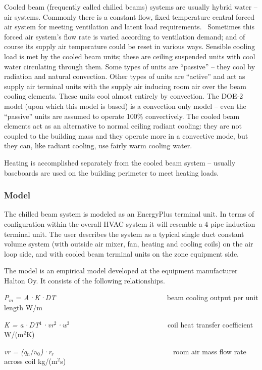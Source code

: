Cooled beam (frequently called chilled beams) systems are usually hybrid water -- air systems. Commonly there is a constant flow, fixed temperature central forced air system for meeting ventilation and latent load requirements.~ Sometimes this forced air system's flow rate is varied according to ventilation demand; and of course its supply air temperature could be reset in various ways. Sensible cooling load is met by the cooled beam units; these are ceiling suspended units with cool water circulating through them. Some types of units are ``passive'' -- they cool by radiation and natural convection. Other types of units are ``active'' and act as supply air terminal units with the supply air inducing room air over the beam cooling elements. These units cool almost entirely by convection. The DOE-2 model (upon which this model is based) is a convection only model -- even the ``passive'' units are assumed to operate 100\% convectively. The cooled beam elements act as an alternative to normal ceiling radiant cooling: they are not coupled to the building mass and they operate more in a convective mode, but they can, like radiant cooling, use fairly warm cooling water.

Heating is accomplished separately from the cooled beam system -- usually baseboards are used on the building perimeter to meet heating loads.

\subsubsection{Model}\label{model-3}

The chilled beam system is modeled as an EnergyPlus terminal unit. In terms of configuration within the overall HVAC system it will resemble a 4 pipe induction terminal unit. The user describes the system as a typical single duct constant volume system (with outside air mixer, fan, heating and cooling coils) on the air loop side, and with cooled beam terminal units on the zone equipment side.

The model is an empirical model developed at the equipment manufacturer Halton Oy. It consists of the following relationships.

\emph{P\(_{m}\)} = \emph{A·K·DT~~~~~~~} ~~~~~~~~~~~~~~~~~~~~~~~ beam cooling output per unit length W/m

\emph{K = a·DT\(^{1}\)·vr\(^{2}\)·w\(^{3}\)}~~~~~~~~~~~~~~~~~~~~~~~~~~~ coil heat transfer coefficient W/(m\(^{2}\)K)

\emph{vr = (q\(_{n}\)}/a\emph{\(_{0}\))·r\(_{r}\)}~~~~~~~~~~~~~~~~~~~~~~~~~~~~~~~~~ room air mass flow rate across coil kg/(m\(^{2}\)s)

